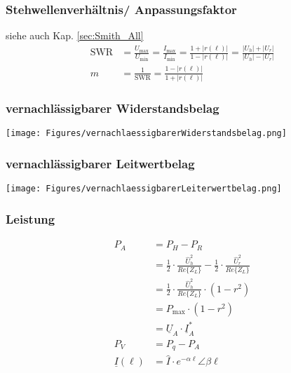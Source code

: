 \subsubsection{Stehwellenverhältnis/ Anpassungsfaktor}
siehe auch Kap. \ref{sec:Smith_All}
\begin{align*}
    \mathrm{SWR}      & = \frac{U_\text{max}}{U_\text{min}} = \frac{I_\text{max}}{I_\text{min}} = \frac{1+|r(\ell)|}{1-|r(\ell)|} = \frac{|U_h|+|U_r|}{|U_h|-|U_r|} \\
    m                 & = \frac{1}{\mathrm{SWR}} = \frac{1 - |r(\ell)|}{1 + |r(\ell)|}
\end{align*}


\subsubsection{vernachlässigbarer Widerstandsbelag}
\texttt{[image: Figures/vernachlaessigbarerWiderstandsbelag.png]}

\subsubsection{vernachlässigbarer Leitwertbelag}
\texttt{[image: Figures/vernachlaessigbarerLeiterwertbelag.png]}


\subsubsection{Leistung}
\begin{align*}
    P_{A}            & = P_{H}-P_{R}                                                                                                 \\
                     & = \frac{1}{2} \cdot \frac{\hat{U}_{h}^{2}}{Re\{Z_{L}\}}-\frac{1}{2} \cdot \frac{\hat{U}_{r}^{2}}{Re\{Z_{L}\}} \\
                     & =\frac{1}{2} \cdot \frac{\hat{U}_{h}^{2}}{Re\{Z_{L}\}} \cdot\left(1-r^{2}\right)                              \\
                     & = P_{\max} \cdot\left(1-r^{2}\right)                                                                          \\
                     & = \underline{U}_A\cdot\underline{I}_A^*                                                                       \\
    P_V              & = P_q -P_A                                                                                                    \\
    \underline{I}(\ell) & = \hat{I}\cdot e^{-\alpha \ell}\angle \beta \ell
\end{align*}
